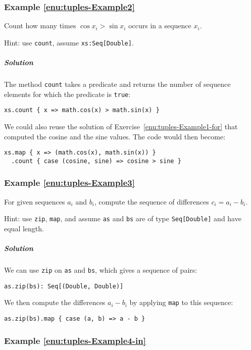 \subsubsection{Example \label{enu:tuples-Example2}\ref{enu:tuples-Example2}}

Count how many times $\cos x_{i}>\sin x_{i}$ occurs in a sequence
$x_{i}$.

Hint: use \lstinline!count!, assume \lstinline!xs:Seq[Double]!.

\subparagraph{Solution }

The method \lstinline!count! takes a predicate and returns the number
of sequence elements for which the predicate is \lstinline!true!:
\begin{lstlisting}
xs.count { x => math.cos(x) > math.sin(x) }
\end{lstlisting}
We could also reuse the solution of Exercise~\ref{enu:tuples-Example1-for}
that computed the cosine and the sine values. The code would then
become:

\begin{lstlisting}
xs.map { x => (math.cos(x), math.sin(x)) }
  .count { case (cosine, sine) => cosine > sine }
\end{lstlisting}


\subsubsection{Example \label{enu:tuples-Example3}\ref{enu:tuples-Example3}}

For given sequences $a_{i}$ and $b_{i}$, compute the sequence of
differences $c_{i}=a_{i}-b_{i}$.

Hint: use \lstinline!zip!, \lstinline!map!, and assume \lstinline!as!
and \lstinline!bs! are of type \lstinline!Seq[Double]! and have
equal length.

\subparagraph{Solution }

We can use \lstinline!zip! on \lstinline!as! and \lstinline!bs!,
which gives a sequence of pairs:
\begin{lstlisting}
as.zip(bs): Seq[(Double, Double)]
\end{lstlisting}
We then compute the differences $a_{i}-b_{i}$ by applying \lstinline!map!
to this sequence:
\begin{lstlisting}
as.zip(bs).map { case (a, b) => a - b }
\end{lstlisting}


\subsubsection{Example \label{enu:tuples-Example4-in}\ref{enu:tuples-Example4-in}}

